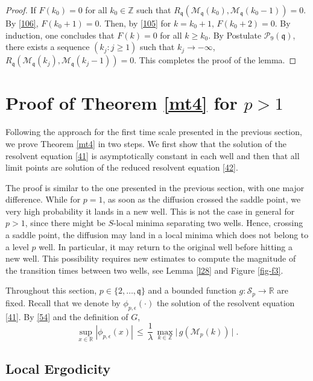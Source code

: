 \documentclass[reqno]{amsart}
\theoremstyle{plain}
\theoremstyle{definition}
\newcommand{\mc}[1]{{\mathcal #1}}
\newcommand{\mf}[1]{{\mathfrak #1}}
\newcommand{\bb}[1]{{\mathbb #1}}
\newcommand{\ms}[1]{{\mathscr #1}}
\newcounter{as}[section]
\newcommand{\<}{\langle}
\renewcommand{\>}{\rangle}
\begin{document}
\begin{proof}
If $F(k_0) = 0$ for all $k_0 \in \bb Z$ such that
$R_{\mf q} (\ms M_{\mf q} (k_0), \ms M_{\mf q} (k_0-1)) = 0$. By
\eqref{106}, $F(k_0+1) = 0$. Then, by \eqref{105} for $k=k_0+1$,
$F(k_0+2) = 0$. By induction, one concludes that $F(k) = 0$ for all
$k\ge k_0$. By Postulate $\mc P_9(\mf q)$, there exists a sequence
$(k_j : j\ge 1)$ such that $k_j\to-\infty$,
$R_{\mf q} (\ms M_{\mf q} (k_j), \ms M_{\mf q} (k_j-1)) = 0$. This
completes the proof of the lemma.
\end{proof}


\section{Proof of Theorem \ref{mt4} for $p>1$}
\label{sec5}


Following the approach for the first time scale presented in the
previous section, we prove Theorem \ref{mt4} in two steps. We first
show that the solution of the resolvent equation \eqref{41} is
asymptotically constant in each well and then that all limit points
are solution of the reduced resolvent equation \eqref{42}.

The proof is similar to the one presented in the previous section,
with one major difference. While for $p=1$, as soon as the diffusion
crossed the saddle point, we very high probability it lands in a new
well. This is not the case in general for $p>1$, since there might be
$S$-local minima separating two wells. Hence, crossing a saddle
point, the diffusion may land in a local minima which does not belong
to a level $p$ well. In particular, it may return to the original well
before hitting a new well. This possibility requires new estimates to
compute the magnitude of the transition times between two wells, see
Lemma \ref{l28} and Figure \ref{fig-f3}. 


Throughout this section, $p\in \{2, \dots, \mf q\}$ and a bounded
function $g\colon\ms S_p \to \bb R$ are fixed. Recall that we denote
by $\phi_{p, \epsilon}(\cdot)$ the solution of the resolvent equation
\eqref{41}.  By \eqref{54} and the definition of $G$,
\begin{equation}
\label{54b}
\sup_{x\in \bb R} |\phi_{p, \epsilon}(x)| \,\le\, \frac{1}{\lambda}\,
\max_{k\in \bb Z}  \big|\, g(\ms M_{p}(k)) \, \big| \;.
\end{equation}

 
\subsection*{Local Ergodicity}
 
\end{document}
